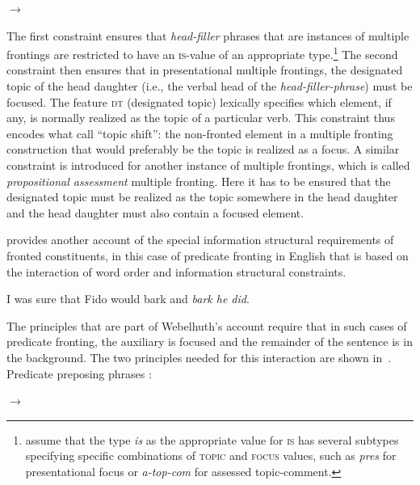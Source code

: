 \documentclass[output=paper]{langsci/langscibook}
\begin{document}
\bigskip
    \begin{avm}
    \end{avm}
$\to$\ 
  \begin{avm}
  \end{avm}
  \label{fig:multiplefronting}
\z
The first constraint ensures that \textit{head-filler} phrases that
are instances of multiple frontings are restricted to have an
\textsc{is}-value of an appropriate type.\footnote{\cite[75]{BC2010a}
  assume that the type \textit{is} as the appropriate value for
  \textsc{is} has several subtypes specifying specific combinations of
  \textsc{topic} and \textsc{focus} values, such as \textit{pres} for
  presentational focus or \textit{a-top-com} for
  assessed topic-comment.} The second constraint then ensures that in
presentational multiple frontings, the designated topic of the head
daughter (i.e., the verbal head of the \textit{head-filler-phrase})
must be focused. The feature \textsc{dt} (designated topic) lexically specifies which
element, if any, is normally realized as the topic of a particular
verb. This constraint thus encodes what \cite{BC2010a} call ``topic
shift'': the non-fronted element in a multiple fronting construction
that would preferably be the topic is realized as a focus. A similar
constraint is introduced for another instance of multiple frontings,
which is called \textit{propositional assessment} multiple
fronting. Here it has to be ensured that the designated topic must be
realized as the topic somewhere in the head daughter and the
head daughter must also contain a focused element.

\cite{Webelhuth2007a-u} provides another account of the special
information structural requirements of fronted constituents, in this
case of predicate fronting in English that is based on the interaction
of word order and information structural constraints.
\begin{exe}
  \ex I was sure that Fido would bark and \textit{bark he did}.
\end{exe}

The principles that are part of Webelhuth's account require that in such cases
of predicate fronting, the auxiliary is focused and the remainder of
the sentence is in the background. The two
principles needed for this interaction are shown in~.
\ea
Predicate preposing phrases \citep{Webelhuth2007a-u}:\\
  \centering
  \begin{avm}
  \end{avm}
$\to$\ 
\begin{avm}
\end{avm}
\end{document}
